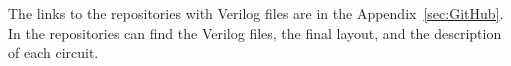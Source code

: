 \begin{table}[H]
    \centering
    \caption{Porcentaje utilize in length of waver per circuit}\label{tab:PorcentUtil}
    \end{table}
The links to the repositories with Verilog files are in the Appendix\ \ref{sec:GitHub}. In the repositories can find the Verilog files, the final layout, and the description of each circuit.